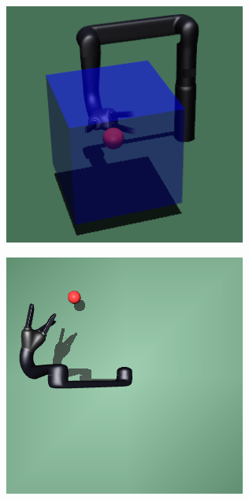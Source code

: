 \begin{figure}[h!]
\begin{subfigure}{0.24\columnwidth}
    \label{fig:fetch_view}
  \end{subfigure}
  \begin{subfigure}{0.24\columnwidth}
    \includegraphics[width=\linewidth]{figures/chapter6/jaco_vol_resize.png}
    \label{fig:jaco_volumn}
  \end{subfigure}
  \begin{subfigure}{0.24\columnwidth}
    \includegraphics[width=\linewidth]{figures/chapter6/jaco_top.png}

\end{subfigure}
\end{figure}
